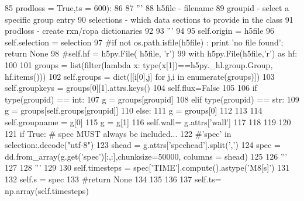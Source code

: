 \begin{DoxyCode}
85         prodloss = \textcolor{keyword}{True},ts = 600):
86 
87         \textcolor{stringliteral}{'''}
88 \textcolor{stringliteral}{        h5file     - filename}
89 \textcolor{stringliteral}{        groupid    - select a specific group entry}
90 \textcolor{stringliteral}{        selections - which data sections to provide in the class}
91 \textcolor{stringliteral}{        prodloss   - create rxn/ropa dictionaries}
92 \textcolor{stringliteral}{}
93 \textcolor{stringliteral}{        '''}
94 
95         self.origin = h5file
96         self.selection = selection
97         \textcolor{comment}{#if not os.path.isfile(h5file) : print 'no file found'; return None}
98         \textcolor{comment}{#self.hf = h5py.File( h5file, 'r')}
99         with h5py.File(h5file,\textcolor{stringliteral}{'r') as hf:}
100 \textcolor{stringliteral}{}
101 \textcolor{stringliteral}{            groups = list(filter(}\textcolor{keyword}{lambda} x: type(x[1])==h5py.\_hl.group.Group, hf.items()))
102             self.groups = dict([[i[0],j] \textcolor{keywordflow}{for} j,i \textcolor{keywordflow}{in} enumerate(groups)])
103             self.groupkeys = groups[0][1].attrs.keys()
104             self.flux=\textcolor{keyword}{False}
105 
106             \textcolor{keywordflow}{if} type(groupid) == int:
107                 g = groups[groupid]
108             \textcolor{keywordflow}{elif} type(groupid) == str:
109                 g = groups[self.groups[groupid]]
110             \textcolor{keywordflow}{else}:
111                 g = groups[0]
112 
113 
114             self.groupname = g[0]
115             g = g[1]
116             self.wall= g.attrs[\textcolor{stringliteral}{'wall'}]
117 
118 
119 
120 
121             \textcolor{keywordflow}{if} \textcolor{keyword}{True}: \textcolor{comment}{# spec MUST always be included...}
122                 \textcolor{comment}{#'spec' in selection:.decode("utf-8")}
123                 shead = g.attrs[\textcolor{stringliteral}{'spechead'}].split(\textcolor{stringliteral}{','})
124                 spec = dd.from\_array(g.get(\textcolor{stringliteral}{'spec'})[:,:],chunksize=50000, columns = shead)
125 
126                 \textcolor{stringliteral}{'''}
127 \textcolor{stringliteral}{}
128 \textcolor{stringliteral}{                '''}
129 
130                 self.timesteps = spec[\textcolor{stringliteral}{'TIME'}].compute().astype(\textcolor{stringliteral}{'M8[s]'})
131 
132                 self.s = spec
133                 \textcolor{comment}{#return None}
134 
135 
136 
137                 self.ts= np.array(self.timesteps)

\end{DoxyCode}
